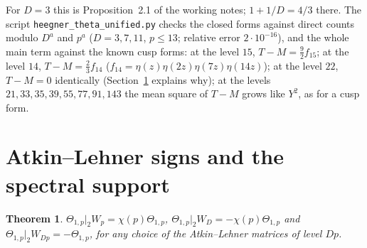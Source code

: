\documentclass[11pt]{amsart}
\newtheorem{theorem}{Theorem}[section]
\theoremstyle{remark}
\begin{document}
For $D=3$ this is Proposition~2.1 of the working notes; $1+1/D=4/3$ there. The script \texttt{heegner\_theta\_unified.py} checks the closed forms against direct counts modulo $D^a$ and $p^a$ ($D=3,7,11$, $p\le13$; relative error $2\cdot10^{-16}$), and the whole main term against the known cusp forms: at the level $15$, $T-M=\frac92f_{15}$; at the level $14$, $T-M=\frac23f_{14}$ ($f_{14}=\eta(z)\eta(2z)\eta(7z)\eta(14z)$); at the level $22$, $T-M=0$ identically (Section~\ref{sec:support} explains why); at the levels $21,33,35,39,55,77,91,143$ the mean square of $T-M$ grows like $Y^2$, as for a cusp form.

\section{Atkin--Lehner signs and the spectral support}\label{sec:support}
\begin{theorem}\label{thm:AL}
$\Theta_{1,p}|_2W_p=\chi(p)\Theta_{1,p}$, $\Theta_{1,p}|_2W_D=-\chi(p)\Theta_{1,p}$ and $\Theta_{1,p}|_2W_{Dp}=-\Theta_{1,p}$, for any choice of the Atkin--Lehner matrices of level $Dp$.
\end{theorem}
\end{document}
